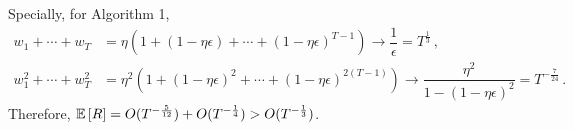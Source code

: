\documentclass[11pt,letterpaper,english]{article}
\begin{document}
Specially, for Algorithm 1, 
\begin{align*}
w_1+\cdots+w_T&= \eta \left( 1+(1-\eta \epsilon)+\cdots+(1-\eta \epsilon)^{T-1} \right)\to \dfrac{1}{\epsilon} =T^{\frac{1}{3}}\,,\\
w_1^2+\cdots+w_T^2&=\eta^2 \left( 1+(1-\eta \epsilon)^2+\cdots+(1-\eta \epsilon)^{2(T-1)} \right) \to \dfrac{\eta^2}{1-(1-\eta \epsilon)^2}= T^{-\frac{7}{24}}\,.
\end{align*}
Therefore, $\mathbb{E}\left[R\right] = O(T^{-\frac{5}{12}})+O(T^{-\frac{1}{4}})>O(T^{-\frac{1}{3}})$.
\end{document}
